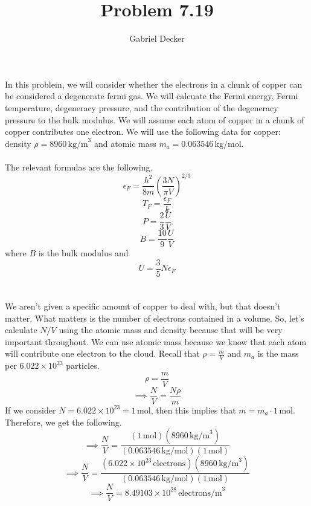 \documentclass[12pt]{article}
\title{Problem 7.19}
\author{Gabriel Decker}
\newcommand{\avogadro}{6.022\times10^{23}}
\begin{document}
\maketitle
\begin{flushleft}



In this problem, we will consider whether the electrons in a chunk of copper can be considered a degenerate fermi gas.
We will calcuate the Fermi energy, Fermi temperature, degeneracy pressure, and the contribution of the degeneracy pressure to the bulk modulus.
We will assume each atom of copper in a chunk of copper contributes one electron.
We will use the following data for copper: density $\rho=8960\,\text{kg/m}^3$ and atomic mass $m_a=0.063546\,\text{kg/mol}$.\\~\\

The relevant formulas are the following.
\begin{equation}
    \epsilon_F=\frac{h^2}{8m}\left(\frac{3N}{\pi V}\right)^{2/3}
\end{equation}
\begin{equation}
    T_F=\frac{\epsilon_F}{k}
\end{equation}
\begin{equation}
    P=\frac{2}{3}\frac{U}{V}
\end{equation}
\begin{equation}
    B=\frac{10}{9}\frac{U}{V}
\end{equation}
where $B$ is the bulk modulus and
\begin{equation}
    U=\frac{3}{5}N\epsilon_F
\end{equation}\\~\\

We aren't given a specific amount of copper to deal with, but that doesn't matter.
What matters is the number of electrons contained in a volume.
So, let's calculate $N/V$ using the atomic mass and density because that will be very important throughout.
We can use atomic mass because we know that each atom will contribute one electron to the cloud.
Recall that $\rho=\frac{m}{V}$ and $m_a$ is the mass per $\avogadro$ particles.
$$\rho=\frac{m}{V}$$
$$\implies\frac{N}{V}=\frac{N\rho}{m}$$
If we consider $N=\avogadro=1\,\text{mol}$, then this implies that $m=m_a\cdot1\,\text{mol}$. Therefore, we get the following.
$$\implies\frac{N}{V}=\frac{(1\,\text{mol})(8960\,\text{kg/m}^3)}{(0.063546\,\text{kg/mol})(1\,\text{mol})}$$
$$\implies\frac{N}{V}=\frac{(\avogadro\,\text{electrons})(8960\,\text{kg/m}^3)}{(0.063546\,\text{kg/mol})(1\,\text{mol})}$$
$$\implies\frac{N}{V}=8.49103\times10^{28}\,\text{electrons/m}^3$$\\~\\


\end{flushleft}
\end{document}
